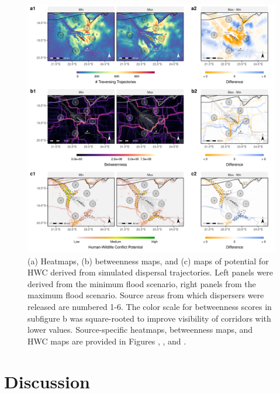 \documentclass[../FinalThesis.tex]{subfiles}
\begin{document}
\begin{figure}[htpb]
 \begin{center}
  \includegraphics[width = \textwidth]{Figures/Metrics.png}
  \caption{(a) Heatmaps, (b) betweenness maps, and (c) maps of potential for HWC
  derived from simulated dispersal trajectories. Left panels were derived from
  the minimum flood scenario, right panels from the maximum flood scenario.
  Source areas from which dispersers were released are numbered 1-6. The color
  scale for betweenness scores in subfigure b was square-rooted to improve
  visibility of corridors with lower values. Source-specific heatmaps,
  betweenness maps, and HWC maps are provided in Figures ,
  , and .}
  \label{Metrics}
 \end{center}
\end{figure}

\section{Discussion}

\end{document}
